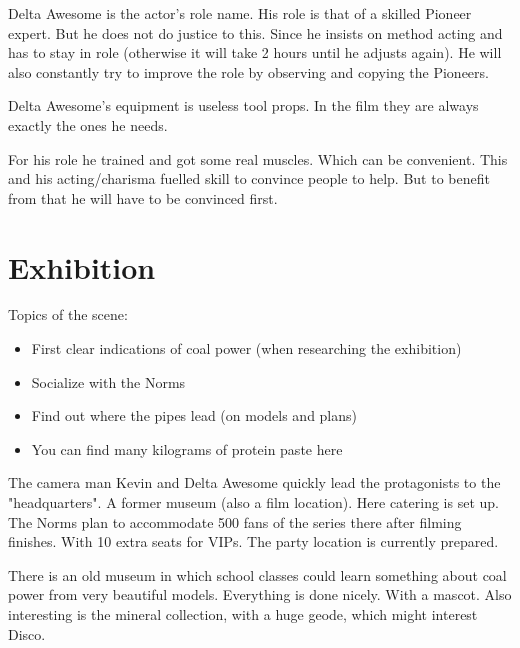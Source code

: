 \begin{npcBox}[title=Delta Awesome - acting the victim]
    \begin{consequences}
    \item {}
    \item {}
    \item {}
    \end{consequences}

    \begin{npcDescription}
    Delta Awesome is the actor's role name. His role is that of a skilled Pioneer expert. But he does not do justice to this. Since he insists on method acting and has to stay in role (otherwise it will take 2 hours until he adjusts again). He will also constantly try to improve the role by observing and copying the Pioneers.

    Delta Awesome's equipment is useless tool props. In the film they are always exactly the ones he needs.

    For his role he trained and got some real muscles. Which can be convenient. This and his acting/charisma fuelled skill to convince people to help. But to benefit from that he will have to be convinced first.
    \end{npcDescription}

\end{npcBox}


\section{Exhibition}

Topics of the scene:
\begin{itemize}
\item First clear indications of coal power (when researching the exhibition)
\item Socialize with the Norms
\item Find out where the pipes lead (on models and plans)
\item You can find many kilograms of protein paste here
\end{itemize}


The camera man Kevin and Delta Awesome quickly lead the protagonists to the "headquarters". A former museum (also a film location). Here catering is set up. The Norms plan to accommodate 500 fans of the series there after filming finishes. With 10 extra seats for VIPs. The party location is currently prepared.

There is an old museum in which school classes could learn something about coal power from very beautiful models.
Everything is done nicely. With a mascot. Also interesting is the mineral collection, with a huge geode, which might interest Disco.

